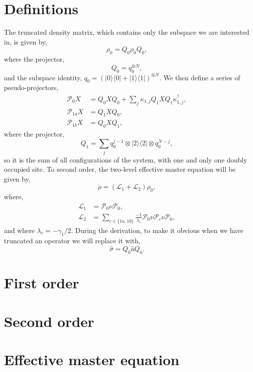 \section{Definitions}
The truncated density matrix, which contains only the subspace we are interested in, is given by, 
\begin{equation}
	\rho_{0} = Q_{0}\rho_{0}Q_{0},
	\label{eq:adelim6}
\end{equation}
where the projector,
\begin{equation}
	Q_{0} = q_{0}^{\otimes N},
	\label{eq:adelim7}
\end{equation}
and the subspace identity, \(q_{0} = (|0 \rangle \langle 0| + |1 \rangle \langle 1|)^{\otimes N}\). We then define a series of pseudo-projectors, 
\begin{align}
	\mathcal{P}_{0}X &= Q_{0}XQ_{0} + \sum_{j} \kappa_{1,j}Q_{1}XQ_{1}\kappa_{1,j}^{\dagger}, \label{eq:adelim8} \\
	\mathcal{P}_{1a}X &= Q_{1}XQ_{0}, \label{eq:adelim9} \\
	\mathcal{P}_{1b}X &= Q_{0}XQ_{1}, \label{eq:adelim10}
\end{align}
where the projector,
\begin{equation}
	Q_{1} = \sum_{j} q_{0}^{j-1} \otimes |2 \rangle \langle 2| \otimes q_{0}^{N-j},
	\label{eq:adelim11}
\end{equation}
so it is the sum of all configurations of the system, with one and only one doubly occupied site. To second order, the two-level effective master equation will be given by,
\begin{equation}
	\dot{\rho} = \left(\mathcal{L}_{1} + \mathcal{L}_{2}\right)\rho_{0},
	\label{eq:adelim12}
\end{equation}
where,
\begin{align}
	\mathcal{L}_{1} &= \mathcal{P}_{0}\nu\mathcal{P}_{0}, \label{eq:adelim13} \\
	\mathcal{L}_{2} &= \sum_{c \in \{1a, 1b\}} \frac{-1}{\lambda_{c}} \mathcal{P}_{0}\nu\mathcal{P}_{c}\nu\mathcal{P}_{0}, \label{eq:adelim14}
\end{align}
and where \(\lambda_{c} = -\gamma_{1}/2\). During the derivation, to make it obvious when we have truncated an operator we will replace it with,
\begin{equation}
	\hat{\sigma} = Q_{0}\hat{a}Q_{0}.
	\label{eq:adelim15}
\end{equation}

\section{First order}

\section{Second order}

\section{Effective master equation}